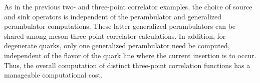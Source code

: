 As in the previous two- and three-point correlator examples, the choice
of source and sink operators is independent of the perambulator and
generalized perambulator computations.  These latter generalized
perambulators can be shared among meson three-point correlator
calculations. In addition, for degenerate quarks, only one generalized
perambulator need be computed, independent of the flavor of the quark line
where the current insertion is to occur.
Thus, the overall computation of distinct three-point
correlation functions has a manageable computational cost.

